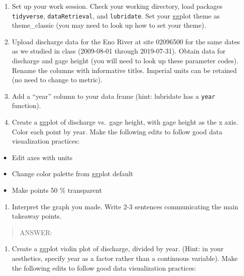 \documentclass[]{article}
\providecommand{\tightlist}{%
  \setlength{\itemsep}{0pt}\setlength{\parskip}{0pt}}
\begin{document}
\begin{enumerate}
\def\labelenumi{\arabic{enumi}.}
\setcounter{enumi}{5}
\item
  Set up your work session. Check your working directory, load packages
  \texttt{tidyverse}, \texttt{dataRetrieval}, and \texttt{lubridate}.
  Set your ggplot theme as theme\_classic (you may need to look up how
  to set your theme).
\item
  Upload discharge data for the Eno River at site 02096500 for the same
  dates as we studied in class (2009-08-01 through 2019-07-31). Obtain
  data for discharge and gage height (you will need to look up these
  parameter codes). Rename the columns with informative titles. Imperial
  units can be retained (no need to change to metric).
\item
  Add a ``year'' column to your data frame (hint: lubridate has a
  \texttt{year} function).
\item
  Create a ggplot of discharge vs.~gage height, with gage height as the
  x axis. Color each point by year. Make the following edits to follow
  good data visualization practices:
\end{enumerate}

\begin{itemize}
\tightlist
\item
  Edit axes with units
\item
  Change color palette from ggplot default
\item
  Make points 50 \% transparent
\end{itemize}

\begin{enumerate}
\def\labelenumi{\arabic{enumi}.}
\setcounter{enumi}{9}
\tightlist
\item
  Interpret the graph you made. Write 2-3 sentences communicating the
  main takeaway points.
\end{enumerate}

\begin{quote}
ANSWER:
\end{quote}

\begin{enumerate}
\def\labelenumi{\arabic{enumi}.}
\setcounter{enumi}{10}
\tightlist
\item
  Create a ggplot violin plot of discharge, divided by year. (Hint: in
  your aesthetics, specify year as a factor rather than a continuous
  variable). Make the following edits to follow good data visualization
  practices:
\end{enumerate}
\end{document}

